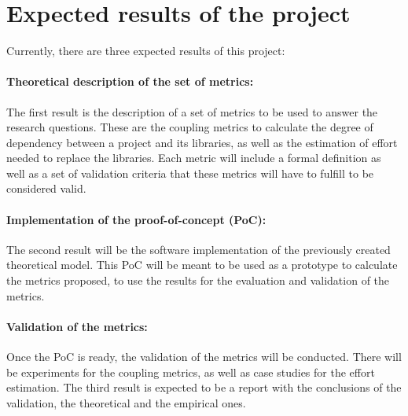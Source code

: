 \section{Expected results of the project} \label{section:expectedResults}
Currently, there are three expected results of this project:

\paragraph{Theoretical description of the set of metrics:}
The first result is the description of a set of metrics to be used to answer the research questions. These are the coupling metrics to calculate the degree of dependency between a project and its libraries, as well as the estimation of effort needed to replace the libraries.
Each metric will include a formal definition as well as a set of validation criteria that these metrics will have to fulfill to be considered valid.

\paragraph{Implementation of the proof-of-concept (PoC):}
The second result will be the software implementation of the previously created theoretical model.
This PoC will be meant to be used as a prototype to calculate the metrics proposed, to use the results for the evaluation and validation of the metrics.

\paragraph{Validation of the metrics:}
Once the PoC is ready, the validation of the metrics will be conducted. There will be experiments for the coupling metrics, as well as case studies for the effort estimation.
The third result is expected to be a report with the conclusions of the validation, the theoretical and the empirical ones.
